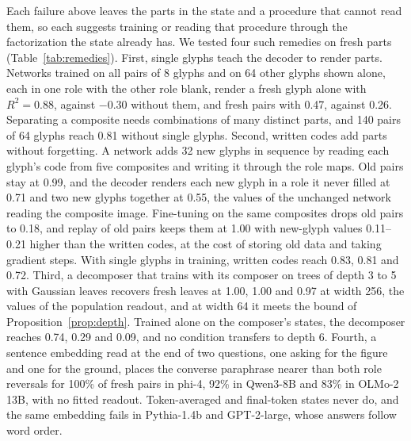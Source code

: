 \documentclass[10pt]{article}
\theoremstyle{plain}
\theoremstyle{remark}
\begin{document}
Each failure above leaves the parts in the state and a procedure that cannot read them, so each suggests training or reading that procedure through the factorization the state already has. We tested four such remedies on fresh parts (Table~\ref{tab:remedies}). First, single glyphs teach the decoder to render parts. Networks trained on all pairs of 8 glyphs and on 64 other glyphs shown alone, each in one role with the other role blank, render a fresh glyph alone with $R^2 = 0.88$, against $-0.30$ without them, and fresh pairs with 0.47, against 0.26. Separating a composite needs combinations of many distinct parts, and 140 pairs of 64 glyphs reach 0.81 without single glyphs. Second, written codes add parts without forgetting. A network adds 32 new glyphs in sequence by reading each glyph's code from five composites and writing it through the role maps. Old pairs stay at 0.99, and the decoder renders each new glyph in a role it never filled at 0.71 and two new glyphs together at 0.55, the values of the unchanged network reading the composite image. Fine-tuning on the same composites drops old pairs to 0.18, and replay of old pairs keeps them at 1.00 with new-glyph values 0.11--0.21 higher than the written codes, at the cost of storing old data and taking gradient steps. With single glyphs in training, written codes reach 0.83, 0.81 and 0.72. Third, a decomposer that trains with its composer on trees of depth 3 to 5 with Gaussian leaves recovers fresh leaves at 1.00, 1.00 and 0.97 at width 256, the values of the population readout, and at width 64 it meets the bound of Proposition~\ref{prop:depth}. Trained alone on the composer's states, the decomposer reaches 0.74, 0.29 and 0.09, and no condition transfers to depth 6. Fourth, a sentence embedding read at the end of two questions, one asking for the figure and one for the ground, places the converse paraphrase nearer than both role reversals for 100\% of fresh pairs in phi-4, 92\% in Qwen3-8B and 83\% in OLMo-2 13B, with no fitted readout. Token-averaged and final-token states never do, and the same embedding fails in Pythia-1.4b and GPT-2-large, whose answers follow word order.
\end{document}
